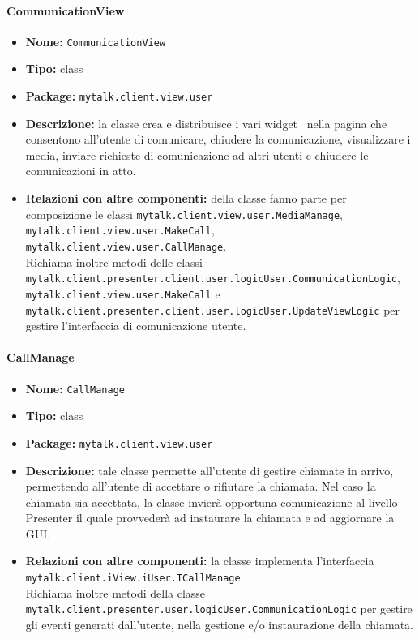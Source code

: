 {{\paragraph{CommunicationView}{
	\begin{itemize}
		\item [] \textbf{Nome:} \texttt{CommunicationView}
		\item [] \textbf{Tipo:} class
		\item [] \textbf{Package:} \texttt{mytalk.client.view.user}
		\item [] \textbf{Descrizione:} la classe crea e distribuisce i vari widget\g~ nella pagina che consentono all'utente di comunicare, chiudere la comunicazione, visualizzare i media, inviare richieste di comunicazione ad altri utenti e chiudere le comunicazioni in atto.
		\item [] \textbf{Relazioni con altre componenti:} della classe fanno parte per composizione le classi \texttt{mytalk.client.view.user.MediaManage}, \texttt{mytalk.client.view.user.MakeCall},\\ \texttt{mytalk.client.view.user.CallManage}.\\
		Richiama inoltre metodi delle classi \\
		\texttt{mytalk.client.presenter.client.user.logicUser.CommunicationLogic}, \\
		\texttt{mytalk.client.view.user.MakeCall} e \\
		\texttt{mytalk.client.presenter.client.user.logicUser.UpdateViewLogic} per gestire l'interfaccia di comunicazione utente.
	\end{itemize}
}
\paragraph{CallManage}{
	\begin{itemize}
		\item [] \textbf{Nome:} \texttt{CallManage}
		\item [] \textbf{Tipo:} class
		\item [] \textbf{Package:} \texttt{mytalk.client.view.user}
		\item [] \textbf{Descrizione:} tale classe permette all'utente di gestire chiamate in arrivo, permettendo all'utente di accettare o rifiutare la chiamata. Nel caso la chiamata sia accettata, la classe invierà opportuna comunicazione al livello Presenter il quale provvederà ad instaurare la chiamata e ad aggiornare la GUI\g.
		\item [] \textbf{Relazioni con altre componenti:} la classe implementa l'interfaccia\\ \texttt{mytalk.client.iView.iUser.ICallManage}.\\
		Richiama inoltre metodi della classe \\ \texttt{mytalk.client.presenter.user.logicUser.CommunicationLogic} per gestire gli eventi generati dall'utente, nella gestione e/o instaurazione della chiamata.
	\end{itemize}
}
}}
